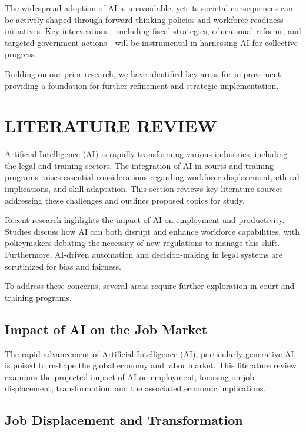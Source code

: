 \documentclass[a4paper,headinclude=on,footinclude=on,12pt,oneside]{scrbook}
\begin{document}
The widespread adoption of AI is unavoidable, yet its societal consequences can be actively shaped through forward-thinking policies and workforce readiness initiatives. Key interventions—including fiscal strategies, educational reforms, and targeted government actions—will be instrumental in harnessing AI for collective progress.

Building on our prior research, we have identified key areas for improvement, providing a foundation for further refinement and strategic implementation.

\section*{LITERATURE REVIEW}

Artificial Intelligence (AI) is rapidly transforming various industries, including the legal and training sectors. The integration of AI in courts and training programs raises essential considerations regarding workforce displacement, ethical implications, and skill adaptation. This section reviews key literature sources addressing these challenges and outlines proposed topics for study.

Recent research highlights the impact of AI on employment and productivity. Studies discuss how AI can both disrupt and enhance workforce capabilities, with policymakers debating the necessity of new regulations to manage this shift. Furthermore, AI-driven automation and decision-making in legal systems are scrutinized for bias and fairness.

To address these concerns, several areas require further exploration in court and training programs.

\subsection*{Impact of AI on the Job Market}

The rapid advancement of Artificial Intelligence (AI), particularly generative AI, is poised to reshape the global economy and labor market. This literature review examines the projected impact of AI on employment, focusing on job displacement, transformation, and the associated economic implications.

\subsection*{Job Displacement and Transformation}
\end{document}

